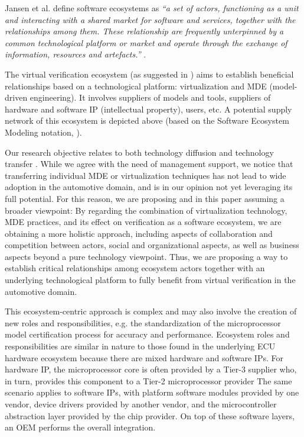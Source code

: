 \small
Jansen et al. define software ecosystems as \emph{``a set of actors, functioning as a unit and interacting with a shared market for software and services, together with the relationships among them. These relationship are frequently unterpinned by a common technological platform or market and operate through the exchange of information, resources and artefacts.''} \cite{Jansen2009}.


The virtual verification ecosystem (as suggested in \cite{Knauss2014d}) aims to establish beneficial relationships based on a technological platform: virtualization and MDE (model-driven engineering).
It involves suppliers of models and tools, suppliers of hardware and software IP (intellectual property), users, etc.
A potential supply network of this ecosystem is depicted above (based on the Software Ecosystem Modeling notation, \cite{Boucharas2009}).

Our research objective relates to both technology diffusion \cite{rogers2010diffusion} and technology transfer \cite{gorschek2006model}.
While we agree with the need of management support, we notice that transferring individual MDE or virtualization techniques has not lead to wide adoption in the automotive domain, and is in our opinion not yet leveraging its full potential.
For this reason, we are proposing and in this paper assuming a broader viewpoint:
By regarding the combination of virtualization technology, MDE practices, and its effect on verification as a software ecosystem, we are obtaining a more holistic approach, including aspects of collaboration and competition between actors, social and organizational aspects, as well as business aspects beyond a pure technology viewpoint.
Thus, we are proposing a way to establish critical relationships among ecosystem actors together with an underlying technological platform to fully benefit from virtual verification in the automotive domain.

This ecosystem-centric approach is complex and may also involve the creation of new roles and responsibilities, e.g. the standardization of the microprocessor model certification process for accuracy and performance.
Ecosystem roles and responsibilities are similar in nature to those found in the underlying ECU hardware ecosystem because there are mixed hardware and software IPs.
For hardware IP, the microprocessor core is often provided by a Tier-3 supplier who, in turn, provides this component to a Tier-2 microprocessor provider
The same scenario applies to software IPs, with platform software modules provided by one vendor, device drivers provided by another vendor, and the microcontroller abstraction layer provided by the chip provider.
On top of these software layers, an OEM performs the overall integration.

